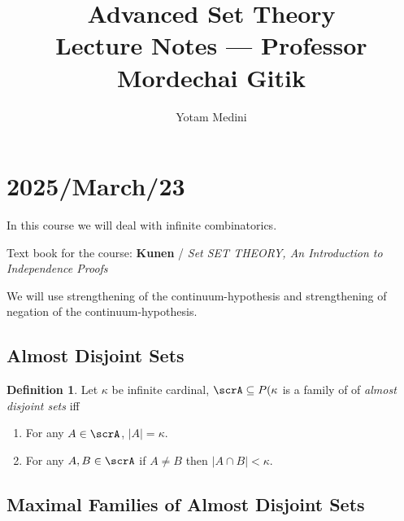 \documentclass[11pt,pdftex,twoside,a4paper]{article}
\title{Advanced Set Theory
          \\
       Lecture Notes --- Professor Mordechai Gitik}
\author{Yotam Medini}
\newcommand{\B}[1]{\textbf{#1}}
\theoremstyle{definition}
\newtheorem{ldef}[thm]{Definition}
\begin{document}
\maketitle
\newpage
\tableofcontents
\newpage

\section{2025/March/23}

In this course we will deal with infinite combinatorics.

Text book for the course:
  \B{Kunen} / \textit{Set SET THEORY, 
    An Introduction to Independence Proofs}

We will use strengthening of the continuum-hypothesis
and strengthening of negation of the continuum-hypothesis.

\subsection{Almost Disjoint Sets}

\begin{ldef}
Let \(\kappa\) be infinite cardinal, \(\scrA \subseteq P(\kappa\)
is a family of of \emph{almost disjoint sets} iff 
\begin{enumerate}
\item For any \(A\in \scrA\), \(|A|=\kappa\).
\item For any \(A,B \in \scrA\) if \(A\neq B\) then \(|A \cap B|<\kappa\).
\end{enumerate}
\end{ldef}

\subsection{Maximal Families of Almost Disjoint Sets}
\end{document}
